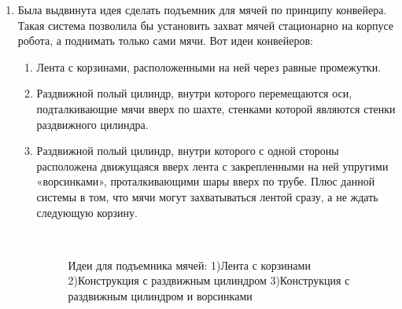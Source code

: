 \begin{enumerate}
\begin{enumerate}
		\item Была выдвинута идея сделать подъемник для мячей по принципу конвейера. Такая система позволила бы установить захват мячей стационарно на корпусе робота, а поднимать только сами мячи. Вот идеи конвейеров:\newline
		\begin{enumerate}
			\item Лента с корзинами, расположенными на ней через равные промежутки.\newline
			
			\item Раздвижной полый цилиндр, внутри которого перемещаются оси, подталкивающие мячи вверх по 
			шахте, стенками которой являются стенки раздвижного цилиндра.\newline
			
			\item Раздвижной полый цилиндр, внутри которого с одной стороны расположена движущаяся вверх лента с закрепленными на ней упругими «ворсинками», проталкивающими шары вверх по трубе. Плюс данной системы в том, что мячи могут захватываться лентой сразу, а не ждать следующую корзину.\newline
			
			\begin{figure}[H]
				\begin{minipage}[h]{0.2\linewidth}
					\center  
				\end{minipage}
				\begin{minipage}[h]{0.6\linewidth}
					\caption{Идеи для подъемника мячей: 1)Лента с корзинами 2)Конструкция с раздвижным цилиндром 3)Конструкция с раздвижным цилиндром и ворсинками}
				\end{minipage}
			\end{figure}
			

\end{enumerate}
\end{enumerate}
\end{enumerate}
